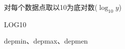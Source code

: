 \label{cmd:log10}

对每个数据点取以10为底对数($\log_{10} y$)

\begin{SACSTX}
LOG10
\end{SACSTX}

depmin、depmax、depmen
